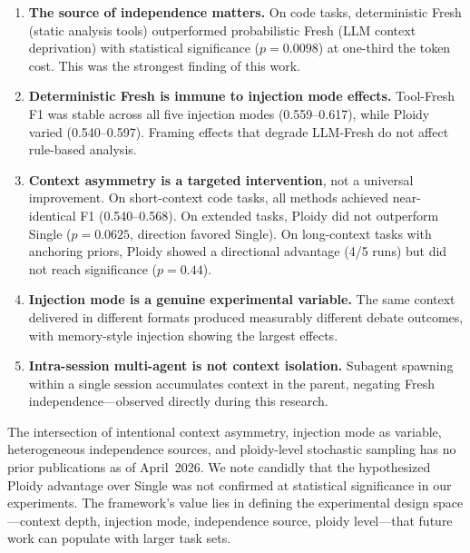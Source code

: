 \documentclass[11pt]{article}
\begin{document}
\begin{enumerate}[label=\arabic*., leftmargin=1.5em]
  \item \textbf{The source of independence matters.} On code tasks, deterministic Fresh (static analysis tools) outperformed probabilistic Fresh (LLM context deprivation) with statistical significance ($p{=}0.0098$) at one-third the token cost. This was the strongest finding of this work.
  \item \textbf{Deterministic Fresh is immune to injection mode effects.} Tool-Fresh F1 was stable across all five injection modes (0.559--0.617), while Ploidy varied (0.540--0.597). Framing effects that degrade LLM-Fresh do not affect rule-based analysis.
  \item \textbf{Context asymmetry is a targeted intervention}, not a universal improvement. On short-context code tasks, all methods achieved near-identical F1 (0.540--0.568). On extended tasks, Ploidy did not outperform Single ($p{=}0.0625$, direction favored Single). On long-context tasks with anchoring priors, Ploidy showed a directional advantage (4/5 runs) but did not reach significance ($p{=}0.44$).
  \item \textbf{Injection mode is a genuine experimental variable.} The same context delivered in different formats produced measurably different debate outcomes, with memory-style injection showing the largest effects.
  \item \textbf{Intra-session multi-agent is not context isolation.} Subagent spawning within a single session accumulates context in the parent, negating Fresh independence---observed directly during this research.
\end{enumerate}

The intersection of intentional context asymmetry, injection mode as variable, heterogeneous independence sources, and ploidy-level stochastic sampling has no prior publications as of April~2026. We note candidly that the hypothesized Ploidy advantage over Single was not confirmed at statistical significance in our experiments. The framework's value lies in defining the experimental design space---context depth, injection mode, independence source, ploidy level---that future work can populate with larger task sets.
\end{document}
